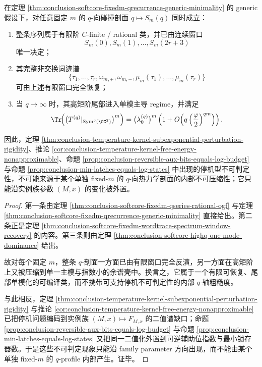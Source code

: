 \begin{theorem}[停机不可判定性不可能内嵌于单个固定分辨率的 \(q\)-剖面]\label{thm:conclusion-halting-undecidability-externalized-from-fixedm-qprofile}
在定理 \ref{thm:conclusion-softcore-fixedm-qrecurrence-generic-minimality} 的 generic 假设下，对任意固定 \(m\) 的 \(q\)-向碰撞剖面 \(q\mapsto S_m(q)\) 同时成立：
\begin{enumerate}
  \item 整条序列属于有限阶 \(C\)-finite / rational 类，并已由连续窗口
  \[
  S_m(0),S_m(1),\dots,S_m(2r+3)
  \]
  唯一决定；
  \item 其完整非交换词迹谱
  \[
  \{\tau_1,\dots,\tau_r,\omega_{m,+},\omega_{m,-},\mu_m(\tau_1),\dots,\mu_m(\tau_r)\}
  \]
  可由上述有限窗口完全恢复；
  \item 当 \(q\to\infty\) 时，其高矩阶尾部进入单模主导 regime，并满足
  \[
  \Tr\!\Bigl(\bigl(T^{(q)}|_{\operatorname{Sym}^q(\CC^2)}\bigr)^m\Bigr)
  =
  \bigl(\lambda_0^{(q)}\bigr)^m
  \left(
  1+O\!\left(q\left(\frac{\varphi}{2}\right)^{qm}\right)
  \right).
  \]
\end{enumerate}
因此，定理 \ref{thm:conclusion-temperature-kernel-subexponential-perturbation-rigidity}、推论 \ref{cor:conclusion-temperature-kernel-free-energy-nonapproximable}、命题 \ref{prop:conclusion-reversible-aux-bits-equals-log-budget} 与命题 \ref{prop:conclusion-min-latches-equals-log-states} 中出现的停机型不可判定性，不可能来源于某个单独 fixed-\(m\) 的 \(q\)-向热力学剖面的内部不可压缩性；它只能沿实例族参数 \((M,x)\) 的变化被外置。
\end{theorem}
\begin{proof}
第一条由定理 \ref{thm:conclusion-softcore-fixedm-qseries-rational-ogf} 与定理 \ref{thm:conclusion-softcore-fixedm-qrecurrence-generic-minimality} 直接给出。第二条正是定理 \ref{thm:conclusion-softcore-fixedm-wordtrace-spectrum-window-recovery} 的内容。第三条则由定理 \ref{thm:conclusion-softcore-highq-one-mode-dominance} 给出。

故对每个固定 \(m\)，整条 \(q\)-剖面一方面已由有限窗口完全反演，另一方面在高矩阶上又被压缩到单一主模与指数小的余谱壳中。换言之，它属于一个有限可恢复、尾部单模化的可编译类，而不携带可支持停机不可判定性的内部 \(q\)-轴粗糙度。

与此相反，定理 \ref{thm:conclusion-temperature-kernel-subexponential-perturbation-rigidity} 与推论 \ref{cor:conclusion-temperature-kernel-free-energy-nonapproximable} 已把停机问题编码到实例族 \((M,x)\mapsto F_{M,x}\) 的二值谱缺口；命题 \ref{prop:conclusion-reversible-aux-bits-equals-log-budget} 与命题 \ref{prop:conclusion-min-latches-equals-log-states} 又把同一二值化外置到可逆辅助位指数与最小锁存器数。于是这些不可判定现象只能沿 family parameter 方向出现，而不能由某个单独 fixed-\(m\) 的 \(q\)-profile 内部产生。证毕。
\end{proof}

